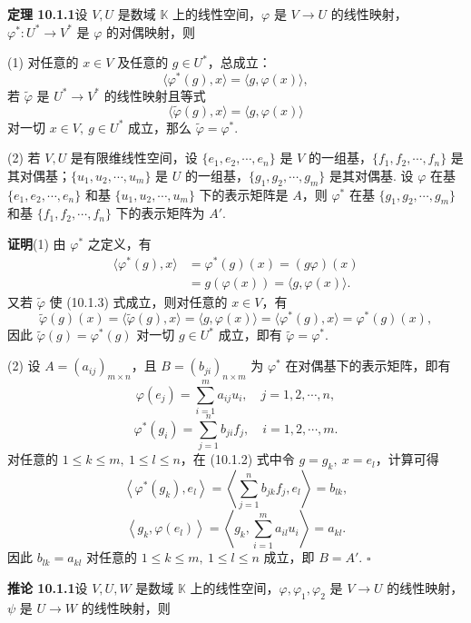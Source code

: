 \documentclass[UTF8, 12pt, fontset=fandol, oneside]{ctexart}
\begin{document}
\noindent\textbf{定理 10.1.1}\quad 设 $V,U$ 是数域 $\mathbb K$ 上的线性空间，$\varphi$ 是 $V\to U$ 的线性映射，$\varphi^*:U^*\to V^*$ 是 $\varphi$ 的对偶映射，则

(1) 对任意的 $x\in V$ 及任意的 $g\in U^*$，总成立：
\begin{equation}
  \langle\varphi^*(g),x\rangle=\langle g,\varphi(x)\rangle,
  \tag{10.1.2}
\end{equation}
若 $\widetilde\varphi$ 是 $U^*\to V^*$ 的线性映射且等式
\begin{equation}
  \langle\widetilde\varphi(g),x\rangle=\langle g,\varphi(x)\rangle
  \tag{10.1.3}
\end{equation}
对一切 $x\in V,\ g\in U^*$ 成立，那么 $\widetilde\varphi=\varphi^*$.

(2) 若 $V,U$ 是有限维线性空间，设 $\{e_1,e_2,\cdots,e_n\}$ 是 $V$ 的一组基，$\{f_1,f_2,\cdots,f_n\}$ 是其对偶基；$\{u_1,u_2,\cdots,u_m\}$ 是 $U$ 的一组基，$\{g_1,g_2,\cdots,g_m\}$ 是其对偶基. 设 $\varphi$ 在基 $\{e_1,e_2,\cdots,e_n\}$ 和基 $\{u_1,u_2,\cdots,u_m\}$ 下的表示矩阵是 $A$，则 $\varphi^*$ 在基 $\{g_1,g_2,\cdots,g_m\}$ 和基 $\{f_1,f_2,\cdots,f_n\}$ 下的表示矩阵为 $A'$.

\noindent\textbf{证明}\quad (1) 由 $\varphi^*$ 之定义，有
\[
\begin{aligned}
  \langle\varphi^*(g),x\rangle&=\varphi^*(g)(x)=(g\varphi)(x)\\
  &=g(\varphi(x))=\langle g,\varphi(x)\rangle.
\end{aligned}
\]
又若 $\widetilde\varphi$ 使 (10.1.3) 式成立，则对任意的 $x\in V$，有
\[
  \widetilde\varphi(g)(x)=\langle\widetilde\varphi(g),x\rangle=\langle g,\varphi(x)\rangle
  =\langle\varphi^*(g),x\rangle=\varphi^*(g)(x),
\]
因此 $\widetilde\varphi(g)=\varphi^*(g)$ 对一切 $g\in U^*$ 成立，即有 $\widetilde\varphi=\varphi^*$.

(2) 设 $A=(a_{ij})_{m\times n}$，且 $B=(b_{ji})_{n\times m}$ 为 $\varphi^*$ 在对偶基下的表示矩阵，即有
\[
  \varphi(e_j)=\sum_{i=1}^m a_{ij}u_i,\quad j=1,2,\cdots,n,
\]
\[
  \varphi^*(g_i)=\sum_{j=1}^n b_{ji}f_j,\quad i=1,2,\cdots,m.
\]
对任意的 $1\le k\le m,\ 1\le l\le n$，在 (10.1.2) 式中令 $g=g_k,\ x=e_l$，计算可得
\[
  \left\langle\varphi^*(g_k),e_l\right\rangle
  =\left\langle\sum_{j=1}^n b_{jk}f_j,e_l\right\rangle=b_{lk},
\]
\[
  \left\langle g_k,\varphi(e_l)\right\rangle
  =\left\langle g_k,\sum_{i=1}^m a_{il}u_i\right\rangle=a_{kl}.
\]
因此 $b_{lk}=a_{kl}$ 对任意的 $1\le k\le m,\ 1\le l\le n$ 成立，即 $B=A'$. $\square$

\noindent\textbf{推论 10.1.1}\quad 设 $V,U,W$ 是数域 $\mathbb K$ 上的线性空间，$\varphi,\varphi_1,\varphi_2$ 是 $V\to U$ 的线性映射，$\psi$ 是 $U\to W$ 的线性映射，则
\end{document}
